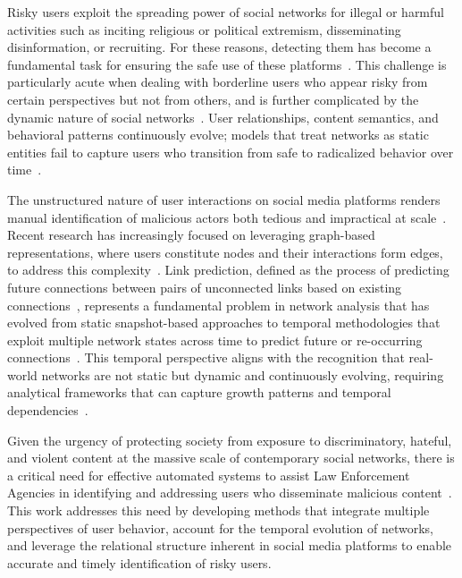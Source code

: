Risky users exploit the spreading power of social networks for illegal or harmful activities such as inciting religious or political extremism, disseminating disinformation, or recruiting. For these reasons, detecting them has become a fundamental task for ensuring the safe use of these platforms~\cite{pellicaniSAIRUSSpatiallyawareIdentification2023,benedettiMultiviewLearningIdentification2025,benedettiIMMENSEInductiveMultiperspective2025}. This challenge is particularly acute when dealing with borderline users who appear risky from certain perspectives but not from others, and is further complicated by the dynamic nature of social networks~\cite{pellicaniSAIRUSSpatiallyawareIdentification2023,benedettiMultiviewLearningIdentification2025}. User relationships, content semantics, and behavioral patterns continuously evolve; models that treat networks as static entities fail to capture users who transition from safe to radicalized behavior over time~\cite{benedettiMultiviewLearningIdentification2025}.

The unstructured nature of user interactions on social media platforms renders manual identification of malicious actors both tedious and impractical at scale~\cite{khanGraphNeuralNetworks2024}. Recent research has increasingly focused on leveraging graph-based representations, where users constitute nodes and their interactions form edges, to address this complexity~\cite{khanGraphNeuralNetworks2024,corizzoHURIHybridUser2023}. Link prediction, defined as the process of predicting future connections between pairs of unconnected links based on existing connections~\cite{daudApplicationsLinkPrediction2020}, represents a fundamental problem in network analysis that has evolved from static snapshot-based approaches to temporal methodologies that exploit multiple network states across time to predict future or re-occurring connections~\cite{tabassumSocialNetworkAnalysis2018,daudApplicationsLinkPrediction2020}. This temporal perspective aligns with the recognition that real-world networks are not static but dynamic and continuously evolving, requiring analytical frameworks that can capture growth patterns and temporal dependencies~\cite{tabassumSocialNetworkAnalysis2018}.

Given the urgency of protecting society from exposure to discriminatory, hateful, and violent content at the massive scale of contemporary social networks, there is a critical need for effective automated systems to assist Law Enforcement Agencies in identifying and addressing users who disseminate malicious content~\cite{benedettiIMMENSEInductiveMultiperspective2025}. This work addresses this need by developing methods that integrate multiple perspectives of user behavior, account for the temporal evolution of networks, and leverage the relational structure inherent in social media platforms to enable accurate and timely identification of risky users.


